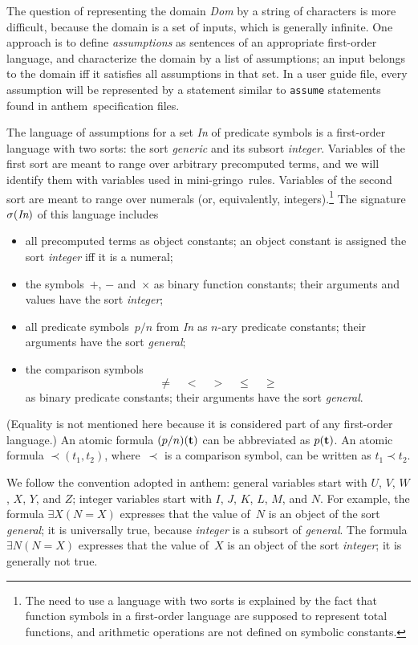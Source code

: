\documentclass{article}
\def\gringo{{\sc gringo}}
\def\anthem{{\sc anthem}}
\begin{document}
{The question of representing the domain \emph{Dom} by a string of
characters is more difficult, because the domain is a set of inputs,
which is generally infinite.
One approach is to define \emph{assumptions} as sentences of an
appropriate first-order language, and characterize the domain by a
list of assumptions; an input belongs to the domain iff it
satisfies all assumptions in that set.  In a user guide file, every
assumption will be represented by a statement similar to \verb|assume|
statements found in \anthem\ specification files.

The language of assumptions for a set \emph{In} of predicate symbols
is a first-order language
with two sorts: the sort \emph{generic} and its subsort
\emph{integer}.
Variables of the first sort are meant to
range over arbitrary precomputed terms, and we will identify them with
variables used in mini-\gringo\ rules.  Variables of the second sort are meant
to range over numerals (or, equivalently, integers).\footnote{The need to
  use a language with two sorts is explained by the fact that function symbols
in a first-order language are supposed to represent total functions, and
arithmetic operations are not defined on symbolic constants.}
The signature $\sigma(\emph{In})$ of this language includes
\begin{itemize}
\item all precomputed terms as object constants; an object constant
  is assigned the sort \emph{integer} iff it is a numeral;
\item the symbols~$+$, $-$ and~$\times$ as binary function constants;
  their arguments and values have the sort \emph{integer};
\item all predicate symbols~$p/n$ from \emph{In} as $n$-ary predicate
  constants; their arguments have the sort \emph{general};
\item the comparison symbols
$$\neq\quad<\quad>\quad\leq\quad\geq$$
as binary predicate constants; their arguments have the sort \emph{general}.
\end{itemize}
(Equality is not mentioned here because it is considered part of any
first-order language.)  An atomic formula $(p/n)({\bf t})$ can be abbreviated
as $p({\bf t})$. An atomic formula $\prec\!\!(t_1,t_2)$, where~$\prec$ is a
comparison symbol, can be written as $t_1\prec t_2$.

We follow the convention adopted in {\sc anthem\/}:
general variables start with $U$, $V$, $W$, $X$, $Y$, and $Z$;
integer variables start with $I$, $J$, $K$, $L$, $M$, and $N$.
For example, the formula
$\exists X (N=X)$ expresses that the value of~$N$ is an object of the sort
\emph{general\/};  it is universally true, because \emph{integer} is a
subsort of \emph{general}.  The formula
$\exists N (N=X)$ expresses that the value of~$X$ is an object of the sort
\emph{integer\/}; it is generally not true.

}
\end{document}
